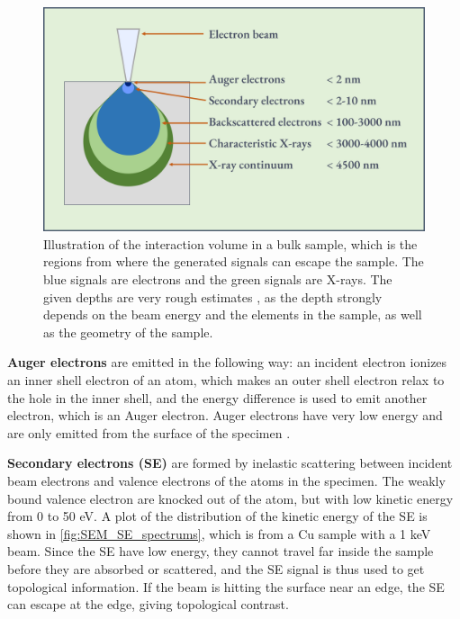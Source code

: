 \begin{figure}[ht]
    \centering
    \includegraphics[width=0.9\linewidth]{figures/interaction_volume.png}
    \caption{
        Illustration of the interaction volume in a bulk sample, which is the regions from where the generated signals can escape the sample.
        The blue signals are electrons and the green signals are X-rays.
        The given depths are very rough estimates \cite{goldstein_scanning_2018,hollas_modern_2004}, as the depth strongly depends on the beam energy and the elements in the sample, as well as the geometry of the sample.
    }
    \label{fig:interaction_volume}
\end{figure}



\textbf{Auger electrons} are emitted in the following way: an incident electron ionizes an inner shell electron of an atom, which makes an outer shell electron relax to the hole in the inner shell, and the energy difference is used to emit another electron, which is an Auger electron.
Auger electrons have very low energy and are only emitted from the surface of the specimen \cite{hollas_modern_2004}.


\textbf{Secondary electrons (SE)} are formed by inelastic scattering between incident beam electrons and valence electrons of the atoms in the specimen.
The weakly bound valence electron are knocked out of the atom, but with low kinetic energy from 0 to 50 eV.
A plot of the distribution of the kinetic energy of the SE is shown in \cref{fig:SEM_SE_spectrums}, which is from a Cu sample with a 1 keV beam.
Since the SE have low energy, they cannot travel far inside the sample before they are absorbed or scattered, and the SE signal is thus used to get topological information.
If the beam is hitting the surface near an edge, the SE can escape at the edge, giving topological contrast.


